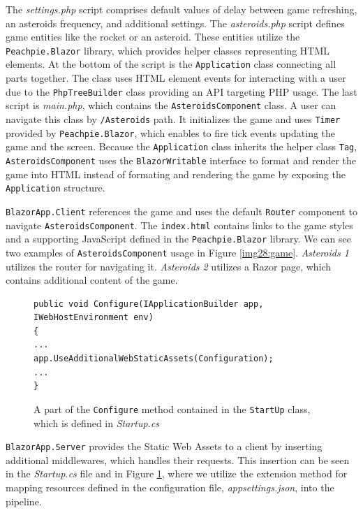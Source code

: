The \textit{settings.php} script comprises default values of delay between game refreshing, an asteroids frequency, and additional settings.
The \textit{asteroids.php} script defines game entities like the rocket or an asteroid.
These entities utilize the \texttt{Peachpie.Blazor} library, which provides helper classes representing HTML elements.
At the bottom of the script is the \texttt{Application} class connecting all parts together.
The class uses HTML element events for interacting with a user due to the \texttt{PhpTreeBuilder} class providing an API targeting PHP usage.
The last script is \textit{main.php}, which contains the \texttt{AsteroidsComponent} class.
A user can navigate this class by \texttt{/Asteroids} path.
It initializes the game and uses \texttt{Timer} provided by \texttt{Peachpie.Blazor}, which enables to fire tick events updating the game and the screen.
Because the \texttt{Application} class inherits the helper class \texttt{Tag}, \texttt{AsteroidsComponent} uses the \texttt{BlazorWritable} interface to format and render the game into HTML instead of formating and rendering the game by exposing the \texttt{Application} structure.
\par
\texttt{BlazorApp.Client} references the game and uses the default \texttt{Router} component to navigate \texttt{AsteroidsComponent}.
The \texttt{index.html} contains links to the game styles and a supporting JavaScript defined in the \texttt{Peachpie.Blazor} library.
We can see two examples of \texttt{AsteroidsComponent} usage in Figure \ref{img28:game}.
\textit{Asteroids 1} utilizes the router for navigating it.
\textit{Asteroids 2} utilizes a Razor page, which contains additional content of the game.
\par
\begin{figure}
\begin{lstlisting}
public void Configure(IApplicationBuilder app, 
IWebHostEnvironment env)
{
...
app.UseAdditionalWebStaticAssets(Configuration);
...
}
\end{lstlisting}
\caption{A part of the \texttt{Configure} method contained in the \texttt{StartUp} class, which is defined in \textit{Startup.cs}}
\label{img21:server}
\end{figure}
\par
\texttt{BlazorApp.Server} provides the Static Web Assets to a client by inserting additional middlewares, which handles their requests.
This insertion can be seen in the \textit{Startup.cs} file and in Figure \ref{img21:server}, where we utilize the extension method for mapping resources defined in the configuration file, \textit{appsettings.json}, into the pipeline.

